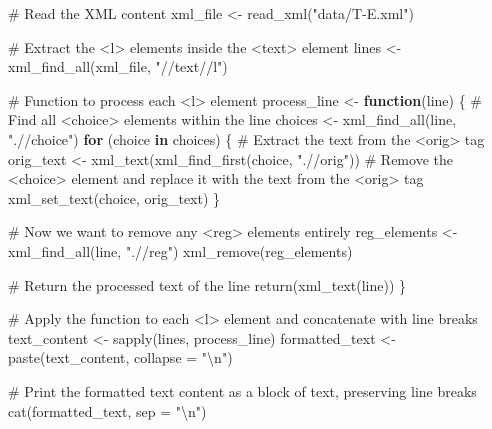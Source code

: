 \documentclass[
  letterpaper,
  DIV=11,
  numbers=noendperiod]{scrreprt}
\newenvironment{Shaded}{\begin{snugshade}}{\end{snugshade}}
\newcommand{\AttributeTok}[1]{\textcolor[rgb]{0.40,0.45,0.13}{#1}}
\newcommand{\CommentTok}[1]{\textcolor[rgb]{0.37,0.37,0.37}{#1}}
\newcommand{\ControlFlowTok}[1]{\textcolor[rgb]{0.00,0.23,0.31}{\textbf{#1}}}
\newcommand{\FunctionTok}[1]{\textcolor[rgb]{0.28,0.35,0.67}{#1}}
\newcommand{\NormalTok}[1]{\textcolor[rgb]{0.00,0.23,0.31}{#1}}
\newcommand{\OtherTok}[1]{\textcolor[rgb]{0.00,0.23,0.31}{#1}}
\newcommand{\SpecialCharTok}[1]{\textcolor[rgb]{0.37,0.37,0.37}{#1}}
\newcommand{\StringTok}[1]{\textcolor[rgb]{0.13,0.47,0.30}{#1}}
\begin{document}
\begin{Shaded}
\begin{Highlighting}[]
\CommentTok{\# Read the XML content}
\NormalTok{xml\_file }\OtherTok{\textless{}{-}} \FunctionTok{read\_xml}\NormalTok{(}\StringTok{"data/T{-}E.xml"}\NormalTok{)}

\CommentTok{\# Extract the \textless{}l\textgreater{} elements inside the \textless{}text\textgreater{} element}
\NormalTok{lines }\OtherTok{\textless{}{-}} \FunctionTok{xml\_find\_all}\NormalTok{(xml\_file, }\StringTok{"//text//l"}\NormalTok{)}

\CommentTok{\# Function to process each \textless{}l\textgreater{} element}
\NormalTok{process\_line }\OtherTok{\textless{}{-}} \ControlFlowTok{function}\NormalTok{(line) \{}
  \CommentTok{\# Find all \textless{}choice\textgreater{} elements within the line}
\NormalTok{  choices }\OtherTok{\textless{}{-}} \FunctionTok{xml\_find\_all}\NormalTok{(line, }\StringTok{".//choice"}\NormalTok{)}
  \ControlFlowTok{for}\NormalTok{ (choice }\ControlFlowTok{in}\NormalTok{ choices) \{}
    \CommentTok{\# Extract the text from the \textless{}orig\textgreater{} tag}
\NormalTok{    orig\_text }\OtherTok{\textless{}{-}} \FunctionTok{xml\_text}\NormalTok{(}\FunctionTok{xml\_find\_first}\NormalTok{(choice, }\StringTok{".//orig"}\NormalTok{))}
    \CommentTok{\# Remove the \textless{}choice\textgreater{} element and replace it with the text from the \textless{}orig\textgreater{} tag}
    \FunctionTok{xml\_set\_text}\NormalTok{(choice, orig\_text)}
\NormalTok{  \}}
  
  \CommentTok{\# Now we want to remove any \textless{}reg\textgreater{} elements entirely}
\NormalTok{  reg\_elements }\OtherTok{\textless{}{-}} \FunctionTok{xml\_find\_all}\NormalTok{(line, }\StringTok{".//reg"}\NormalTok{)}
  \FunctionTok{xml\_remove}\NormalTok{(reg\_elements)}
  
  \CommentTok{\# Return the processed text of the line}
  \FunctionTok{return}\NormalTok{(}\FunctionTok{xml\_text}\NormalTok{(line))}
\NormalTok{\}}

\CommentTok{\# Apply the function to each \textless{}l\textgreater{} element and concatenate with line breaks}
\NormalTok{text\_content }\OtherTok{\textless{}{-}} \FunctionTok{sapply}\NormalTok{(lines, process\_line)}
\NormalTok{formatted\_text }\OtherTok{\textless{}{-}} \FunctionTok{paste}\NormalTok{(text\_content, }\AttributeTok{collapse =} \StringTok{"}\SpecialCharTok{\textbackslash{}n}\StringTok{"}\NormalTok{)}

\CommentTok{\# Print the formatted text content as a block of text, preserving line breaks}
\FunctionTok{cat}\NormalTok{(formatted\_text, }\AttributeTok{sep =} \StringTok{"}\SpecialCharTok{\textbackslash{}n}\StringTok{"}\NormalTok{)}
\end{Highlighting}
\end{Shaded}
\end{document}
